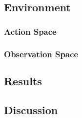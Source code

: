 \subsection{Environment}



\subsubsection{Action Space}



\subsubsection{Observation Space}




\subsection{Results}



\subsection{Discussion}